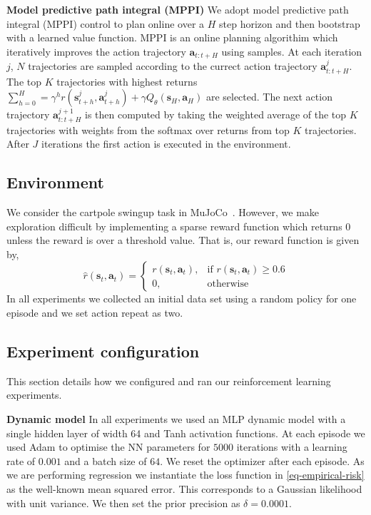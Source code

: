 \documentclass{article} %
\newcommand{\state}{\ensuremath{\mathbf{s}}}
\newcommand{\action}{\ensuremath{\mathbf{a}}}
\newcommand{\Horizon}{\ensuremath{H}}
\begin{document}

\textbf{Model predictive path integral (MPPI)}
We adopt model predictive path integral (MPPI) control \cite{panSample2015,williamsModel2017}
to plan online over a $H$ step horizon and then bootstrap with a learned value function.
MPPI is an online planning algorithim which iteratively improves the action trajectory $\action_{t:t+H}$ using samples.
At each iteration $j$, $N$ trajectories are sampled according to the currect action trajectory $\action^{j}_{t:t+H}$.
The top $K$ trajectories with highest returns $\sum_{h=0}^{H} = \gamma^{h} r(\state^{j}_{t+h}, \action^{j}_{t+h}) + \gamma Q_{\theta}(\state_{\Horizon}, \action_{H})$ are selected.
The next action trajectory $\action^{j+1}_{t:t+H}$ is then computed by taking the weighted average of the top $K$ trajectories
with weights from the softmax over returns from top $K$ trajectories.
After $J$ iterations the first action is executed in the environment.


\subsection{Environment}
We consider the cartpole swingup task in MuJoCo~\cite{todorov2012mujoco}.
However, we make exploration difficult by implementing a sparse reward function which returns $0$ unless the reward is over a threshold value. That is, our reward function is given by,
$$\hat{r}(\state_{t}, \action_{t}) =
\begin{cases}
    r(\state_{t}, \action_{t}),& \text{if } r(\state_{t}, \action_{t})\geq 0.6\\
    0,              & \text{otherwise}
\end{cases}
$$
In all experiments we collected an initial data set using a random policy for one episode and we set action repeat as two.

\subsection{Experiment configuration}
%
This section details how we configured and ran our reinforcement learning experiments.

\textbf{Dynamic model}
In all experiments we used an MLP dynamic model with a single hidden layer of width 64 and Tanh activation functions.
At each episode we used Adam \cite{adam} to optimise the NN parameters for $5000$ iterations with a learning rate of $0.001$ and a batch size of $64$.
We reset the optimizer after each episode.
As we are performing regression we instantiate the loss function in \cref{eq-empirical-risk} as the well-known mean squared error.
This corresponds to a Gaussian likelihood with unit variance.
We then set the prior precision as $\delta=0.0001$.
\end{document}
